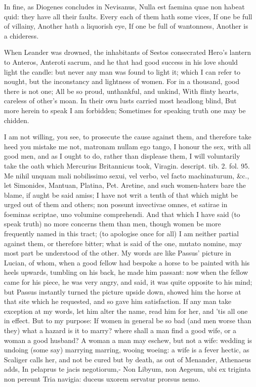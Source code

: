 {In fine, as Diogenes concludes in Nevisanus, Nulla est faemina quae non
habeat quid: they have all their faults.
Every each of them hath some vices,
If one be full of villainy,
Another hath a liquorish eye,
If one be full of wantonness,
Another is a chideress.

When Leander was drowned, the inhabitants of Sestos consecrated Hero's
lantern to Anteros, Anteroti sacrum, and he that had good success
in his love should light the candle: but never any man was found to
light it; which I can refer to nought, but the inconstancy and
lightness of women.
For in a thousand, good there is not one;
All be so proud, unthankful, and unkind,
With flinty hearts, careless of other's moan.
In their own lusts carried most headlong blind,
But more herein to speak I am forbidden;
Sometimes for speaking truth one may be chidden.

I am not willing, you see, to prosecute the cause against them, and
therefore take heed you mistake me not, matronam nullam ego
tango, I honour the sex, with all good men, and as I ought to do,
rather than displease them, I will voluntarily take the oath which
Mercurius Britannicus took, Viragin. descript. tib. 2. fol. 95. Me
nihil unquam mali nobilissimo sexui, vel verbo, vel facto machinaturum,
\&c., let Simonides, Mantuan, Platina, Pet. Aretine, and such
women-haters bare the blame, if aught be said amiss; I have not writ a
tenth of that which might be urged out of them and others; non
possunt invectivae omnes, et satirae in foeminas scriptae, uno volumine
comprehendi. And that which I have said (to speak truth) no more
concerns them than men, though women be more frequently named in this
tract; (to apologise once for all) I am neither partial against them,
or therefore bitter; what is said of the one, mutato nomine, may most
part be understood of the other. My words are like Passus' picture in
Lucian, of whom, when a good fellow had bespoke a horse to be
painted with his heels upwards, tumbling on his back, he made him
passant: now when the fellow came for his piece, he was very angry, and
said, it was quite opposite to his mind; but Passus instantly turned
the picture upside down, showed him the horse at that site which he
requested, and so gave him satisfaction. If any man take exception at
my words, let him alter the name, read him for her, and 'tis all one in
effect.
But to my purpose: If women in general be so bad (and men worse than
they) what a hazard is it to marry? where shall a man find a good wife,
or a woman a good husband? A woman a man may eschew, but not a wife:
wedding is undoing (some say) marrying marring, wooing woeing: a
wife is a fever hectic, as Scaliger calls her, and not be cured but by
death, as out of Menander, Athenaeus adds,
In pelaprus te jacis negotiorum,-
Non Libyum, non Aegeum, ubi ex triginta non pereunt
Tria navigia: duceus uxorem servatur prorsus nemo.

}
